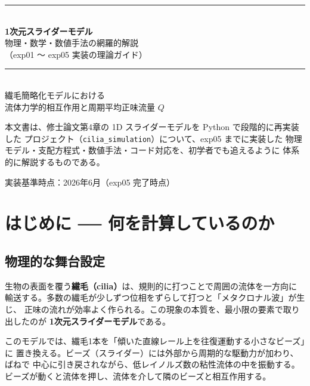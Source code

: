 \documentclass[11pt,a4paper]{article}
\begin{document}
\begin{titlepage}
\centering
\vspace*{2.5cm}
{\color{darkblue}\rule{\linewidth}{1.2pt}}\\[6pt]
{\Huge\bfseries 1次元スライダーモデル}\\[10pt]
{\LARGE 物理・数学・数値手法の網羅的解説}\\[8pt]
{\large（exp01 〜 exp05 実装の理論ガイド）}\\[6pt]
{\color{darkblue}\rule{\linewidth}{1.2pt}}\\[1.5cm]

{\large 繊毛簡略化モデルにおける}\\[4pt]
{\large 流体力学的相互作用と周期平均正味流量 $Q$}\\[2cm]

\begin{minipage}{0.85\linewidth}
\small
本文書は、修士論文第4章の 1D スライダーモデルを Python で段階的に再実装した
プロジェクト（\texttt{cilia\_simulation}）について、exp05 までに実装した
物理モデル・支配方程式・数値手法・コード対応を、初学者でも追えるように
体系的に解説するものである。
\end{minipage}

\vfill
{\large 実装基準時点：2026年6月（exp05 完了時点）}\\[4pt]
\end{titlepage}

\tableofcontents
\newpage

\section{はじめに ── 何を計算しているのか}

\subsection{物理的な舞台設定}

生物の表面を覆う\textbf{繊毛（cilia）}は、規則的に打つことで周囲の流体を一方向に
輸送する。多数の繊毛が少しずつ位相をずらして打つと「メタクロナル波」が生じ、
正味の流れが効率よく作られる。この現象の本質を、最小限の要素で取り出したのが
\textbf{1次元スライダーモデル}である。

このモデルでは、繊毛1本を「傾いた直線レール上を往復運動する小さなビーズ」に
置き換える。ビーズ（スライダー）には外部から周期的な駆動力が加わり、ばねで
中心に引き戻されながら、低レイノルズ数の粘性流体の中を振動する。
ビーズが動くと流体を押し、流体を介して隣のビーズと相互作用する。
\end{document}
